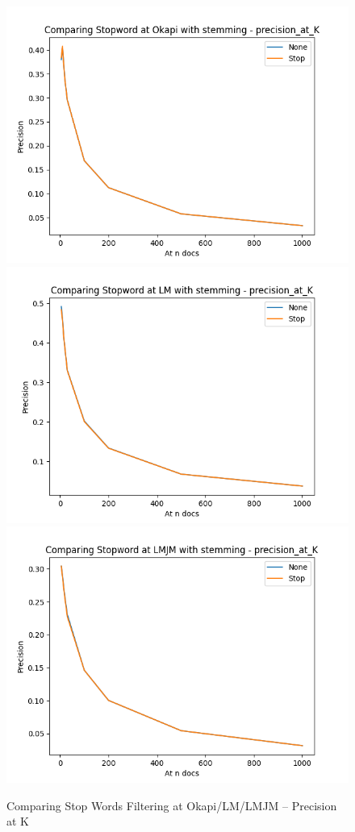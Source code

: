\documentclass[10pt, a4paper]{article}
\begin{document}
\begin{figure}[h!]
\centering
\includegraphics[scale=0.3]{compare stop/Comparing Stopword at Okapi with stemming - precision_at_K-pak.png}
\includegraphics[scale=0.3]{compare stop/Comparing Stopword at LM with stemming - precision_at_K-pak.png}
\includegraphics[scale=0.3]{compare stop/Comparing Stopword at LMJM with stemming - precision_at_K-pak.png}
\caption{Comparing Stop Words Filtering at Okapi/LM/LMJM -- Precision at K}
\label{fig:stop_p}
\end{figure}
\end{document}
